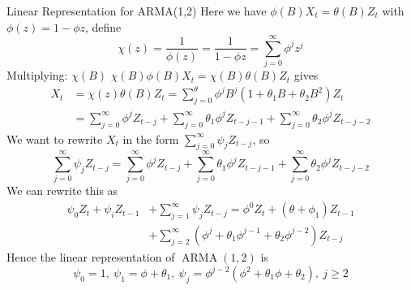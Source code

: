 \documentclass{article}
\DeclareMathOperator{\arma}{ARMA}
\begin{document}
\begin{multicols*}{3}
\begin{blackbox}{Linear Representation for ARMA(1,2)}
    Here we have $\phi(B)X_t = \theta(B)Z_t$ with $\phi(z) = 1 - \phi z$, define\\[-4ex]
    \[\chi(z) = \frac{1}{\phi(z)} = \frac{1}{1-\phi z} = \sum_{j=0}^\infty \phi^jz^j\]
    Multiplying: $\chi(B)$ $\chi(B)\phi(B)X_t = \chi(B)\theta(B)Z_t$ gives\\[-5ex]
    \begin{align*}
        X_t &= \chi(z)\theta(B)Z_t = \sum_{j=0}^\theta\phi^jB^j(1+\theta_1B+\theta_2B^2)Z_t\\
        &= \sum_{j=0}^\infty\phi^jZ_{t-j} + \sum_{j=0}^\infty\theta_1\phi^jZ_{t-j-1} + \sum_{j=0}^\infty\theta_2\phi^jZ_{t-j-2}
    \end{align*}
    We want to rewrite $X_t$ in the form $\sum_{j=0}^\infty \psi_jZ_{t-j}$, so 
\[\sum_{j=0}^\infty \psi_jZ_{t-j}= \sum_{j=0}^\infty\phi^jZ_{t-j} + \sum_{j=0}^\infty\theta_1\phi^jZ_{t-j-1} + \sum_{j=0}^\infty\theta_2\phi^jZ_{t-j-2}\]
We can rewrite this as 
\begin{align*}
    \psi_0Z_t + \psi_iZ_{t-1} &+ \sum_{j=1}^\infty \psi_jZ_{t-j} = \phi^0Z_t + (\theta + \phi_1)Z_{t-1}\\
    &+ \sum_{j=2}^\infty (\phi^j + \theta_1\phi^{j-1}+\theta_2\phi^{j-2})Z_{t-j}  
\end{align*}
Hence the linear representation of $\arma(1,2)$ is 
\[\psi_0 = 1, \ \psi_1 = \phi + \theta_1, \ \psi_j = \phi^{j-2}(\phi^2 + \theta_1\phi + \theta_2), \ j \geq 2\]
\end{blackbox}


\end{multicols*}
\end{document}
